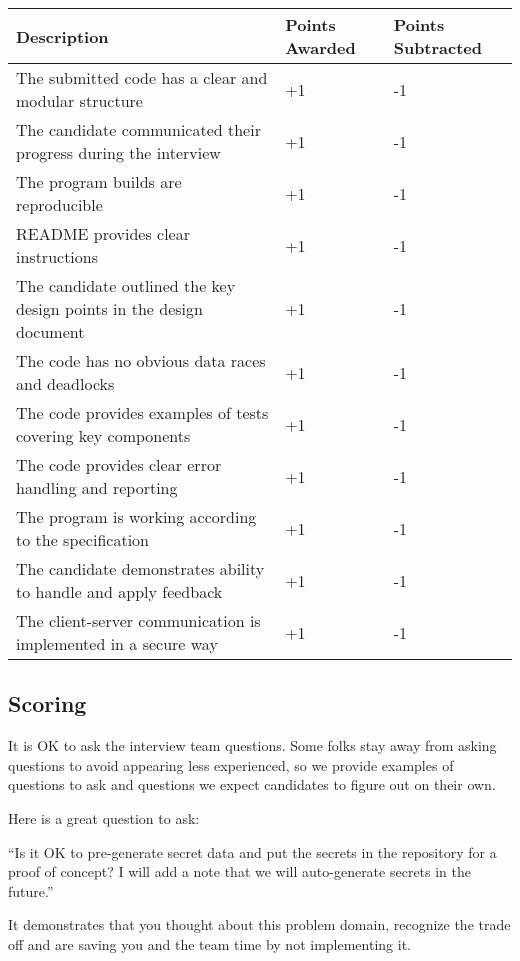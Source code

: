 \documentclass{article}
\begin{document}
\begin{center}
\begin{tabular}{ | m{25em} | m{5em}| m{5em} | }
  \hline
  \rowcolor{blue!60!black!10}
  Description & Points Awarded & Points Subtracted \\
  \hline
  The submitted code has a clear and modular structure & +1 & -1 \\
  \hline   
  The candidate communicated their progress during the interview & +1 & -1 \\
  \hline
  The program builds are reproducible & +1 & -1 \\
  \hline
  README provides clear instructions & +1 & -1 \\
  \hline
  The candidate outlined the key design points in the design document & +1 & -1 \\
  \hline
  The code has no obvious data races and deadlocks & +1 & -1 \\
  \hline
  The code provides examples of tests covering key components & +1 & -1 \\
  \hline
  The code provides clear error handling and reporting & +1 & -1 \\
  \hline
  The program is working according to the specification & +1 & -1 \\
  \hline
  The candidate demonstrates ability to handle and apply feedback & +1 & -1 \\
  \hline
  The client-server communication is implemented in a secure way & +1 & -1 \\
  \hline
\end{tabular}
\end{center}

\subsection{Scoring}

It is OK to ask the interview team questions. Some folks stay away from
asking questions to avoid appearing less experienced, so we provide examples of questions
to ask and questions we expect candidates to figure out on their own.

Here is a great question to ask:

``Is it OK to pre-generate secret data and put the secrets in the repository for a proof of concept? I will add a note that we will auto-generate secrets in the future.''

It demonstrates that you thought about this problem domain, recognize the trade off and are saving you and the team time by not implementing it.
\end{document}
